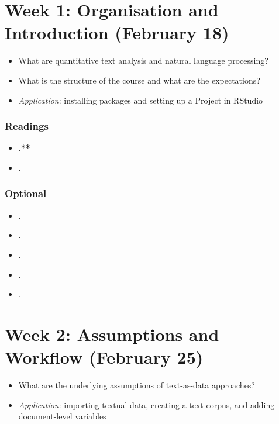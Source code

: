 \documentclass[abstract=on,parskip=full,headings=standardclasses,fontsize=11pt,paper=a4]{scrartcl}
\begin{document}
\tableofcontents

\section{Week 1: Organisation and Introduction (February 18)}

\begin{itemize}
\renewcommand\labelitemi{--}
\item What are quantitative text analysis and natural language processing?
\item What is the structure of the course and what are the expectations?
\item \textit{Application}: installing packages and setting up a Project in RStudio
\end{itemize}

\subsubsection*{Readings}
\begin{itemize}
\item {}.\textbf{**}
\item {}.
\end{itemize}

\subsubsection*{Optional}
\begin{itemize}
\item {}.
\item {}.
\item {}.
\item {}.
\item {}.
\end{itemize}


\section{Week 2: Assumptions and  Workflow (February 25)}

\begin{itemize}
\renewcommand\labelitemi{--}
\item What are the underlying assumptions of text-as-data approaches?
\item \textit{Application}: importing textual data, creating a text corpus, and adding document-level variables
\end{itemize}
\end{document}
